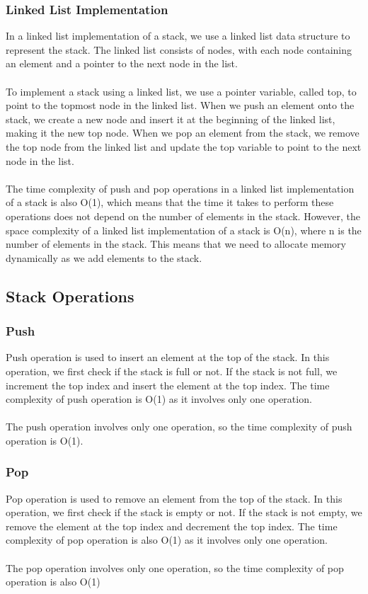 \documentclass[a4paper, 11pt, oneside]{book} %
\begin{document}
                \subsubsection{Linked List Implementation}
                In a linked list implementation of a stack, we use a linked list data structure to represent the stack. The linked list consists of nodes, with each node containing an element and a pointer to the next node in the list.
                \\
                \\
                To implement a stack using a linked list, we use a pointer variable, called top, to point to the topmost node in the linked list. When we push an element onto the stack, we create a new node and insert it at the beginning of the linked list, making it the new top node. When we pop an element from the stack, we remove the top node from the linked list and update the top variable to point to the next node in the list.
                \\
                \\
                The time complexity of push and pop operations in a linked list implementation of a stack is also O(1), which means that the time it takes to perform these operations does not depend on the number of elements in the stack. However, the space complexity of a linked list implementation of a stack is O(n), where n is the number of elements in the stack. This means that we need to allocate memory dynamically as we add elements to the stack.



\subsection{Stack Operations}
\subsubsection{Push}
Push operation is used to insert an element at the top of the stack. In this operation, we first check if the stack is full or not. If the stack is not full, we increment the top index and insert the element at the top index. The time complexity of push operation is O(1) as it involves only one operation.
\\
\\
The push operation involves only one operation, so the time complexity of push operation is O(1).
\subsubsection{Pop}
Pop operation is used to remove an element from the top of the stack. In this operation, we first check if the stack is empty or not. If the stack is not empty, we remove the element at the top index and decrement the top index. The time complexity of pop operation is also O(1) as it involves only one operation.
\\
\\
The pop operation involves only one operation, so the time complexity of pop operation is also O(1)
\end{document}

